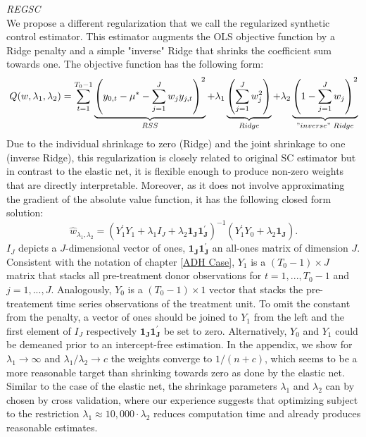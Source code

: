 \textit{\ac{REGSC}} \\
We propose a different regularization that we call the regularized synthetic control estimator. This estimator augments the \ac{OLS} objective function by a Ridge penalty and a simple "inverse" Ridge that shrinks the coefficient sum towards one. The objective function has the following form:
\begin{equation*}
	Q(w, \lambda_1, \lambda_2) = \sum_{t=1}^{T_0-1}\underbrace{\left(y_{0,t} - \mu^* - \sum_{j = 1}^{J} w_j y_{j,t} \right)^2}_{RSS} + 
	\lambda_1 \underbrace{\left( \sum_{j = 1}^{J} w_j^2 \right)}_{Ridge} + 
	\lambda_2 \underbrace{\left(1- \sum_{j = 1}^{J} w_j
	\right)^2}_{"inverse"\text{ }Ridge}  
\end{equation*}
Due to the individual shrinkage to zero (Ridge) and the joint shrinkage to one (inverse Ridge), this regularization is closely related to original \ac{SC} estimator but in contrast to the elastic net, it is flexible enough to produce non-zero weights that are directly interpretable. Moreover, as it does not involve approximating the gradient of the absolute value function, it has the following closed form solution:
 \begin{equation*}
 	\widehat{w}_{\lambda_1, \lambda_2} = (Y_1^\prime Y_1 + \lambda_1 I_J + \lambda_2 \boldsymbol{1_J} \boldsymbol{1_J^\prime})^{-1} (Y_1^\prime Y_0 + \lambda_2 \boldsymbol{1_J}).
 \end{equation*}
$I_J$ depicts a $J$-dimensional vector of ones, $\boldsymbol{1_J} \boldsymbol{1_J^\prime}$ an all-ones matrix of dimension $J$. Consistent with the notation of chapter \ref{ADH Case}, $Y_1$ is a $(T_0-1)\times J$ matrix that stacks all pre-treatment donor observations for $t = 1, ..., T_0-1$ and $j = 1,...,J$. Analogously, $Y_0$ is a $(T_0-1)\times 1$ vector that stacks the pre-treatement time series observations of the treatment unit. To omit the constant from the penalty, a vector of ones should be joined to $Y_1$ from the left and the first element of $I_J$ respectively $\boldsymbol{1_J} \boldsymbol{1_J^\prime}$ be set to zero. Alternatively, $Y_0$ and $Y_1$ could be demeaned prior to an intercept-free estimation. In the appendix, we show for $\lambda_1\to \infty$ and $\lambda_1/\lambda_2 \to c$ the weights converge to $1/(n+c)$, which seems to be a more reasonable target than shrinking towards zero as done by the elastic net. Similar to the case of the elastic net, the shrinkage parameters $\lambda_1$ and $\lambda_2$ can by chosen by cross validation, where our experience suggests that optimizing subject to the restriction $\lambda_1 \approx 10,000 \cdot \lambda_2$ reduces computation time and already produces reasonable estimates. 

